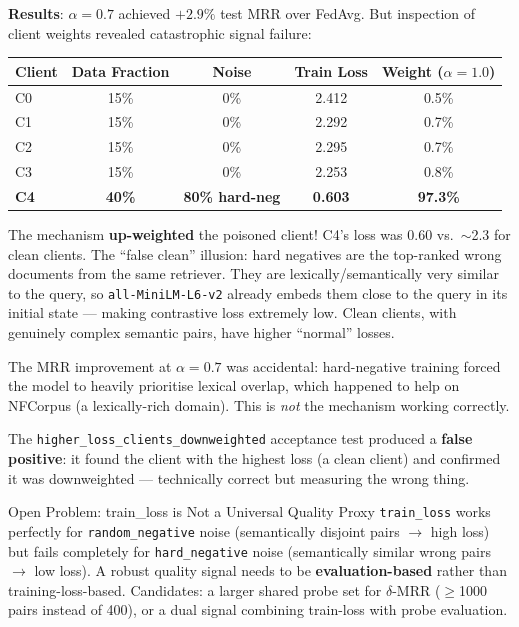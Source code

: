 \documentclass[12pt,a4paper]{article}
\begin{document}
\textbf{Results}: $\alpha=0.7$ achieved $+2.9\%$ test MRR over FedAvg. But inspection of client weights revealed catastrophic signal failure:

\begin{center}
\renewcommand{\arraystretch}{1.3}
\begin{tabular}{lcccc}
\toprule
\textbf{Client} & \textbf{Data Fraction} & \textbf{Noise} & \textbf{Train Loss} & \textbf{Weight ($\alpha=1.0$)} \\
\midrule
C0 & 15\% & 0\% & 2.412 & 0.5\% \\
C1 & 15\% & 0\% & 2.292 & 0.7\% \\
C2 & 15\% & 0\% & 2.295 & 0.7\% \\
C3 & 15\% & 0\% & 2.253 & 0.8\% \\
\textbf{C4} & \textbf{40\%} & \textbf{80\% hard-neg} & \textbf{0.603} & \textbf{97.3\%} \\
\bottomrule
\end{tabular}
\end{center}

The mechanism \textbf{up-weighted} the poisoned client! C4's loss was 0.60 vs.\ $\sim$2.3 for clean clients. The ``false clean'' illusion: hard negatives are the top-ranked wrong documents from the same retriever. They are lexically/semantically very similar to the query, so \texttt{all-MiniLM-L6-v2} already embeds them close to the query in its initial state --- making contrastive loss extremely low. Clean clients, with genuinely complex semantic pairs, have higher ``normal'' losses.

The MRR improvement at $\alpha=0.7$ was accidental: hard-negative training forced the model to heavily prioritise lexical overlap, which happened to help on NFCorpus (a lexically-rich domain). This is \textit{not} the mechanism working correctly.

The \texttt{higher\_loss\_clients\_downweighted} acceptance test produced a \textbf{false positive}: it found the client with the highest loss (a clean client) and confirmed it was downweighted --- technically correct but measuring the wrong thing.

\begin{warnbox}{Open Problem: train\_loss is Not a Universal Quality Proxy}
  \texttt{train\_loss} works perfectly for \texttt{random\_negative} noise (semantically disjoint pairs $\rightarrow$ high loss) but fails completely for \texttt{hard\_negative} noise (semantically similar wrong pairs $\rightarrow$ low loss). A robust quality signal needs to be \textbf{evaluation-based} rather than training-loss-based. Candidates: a larger shared probe set for $\delta$-MRR ($\geq$1000 pairs instead of 400), or a dual signal combining train-loss with probe evaluation.
\end{warnbox}
\end{document}
